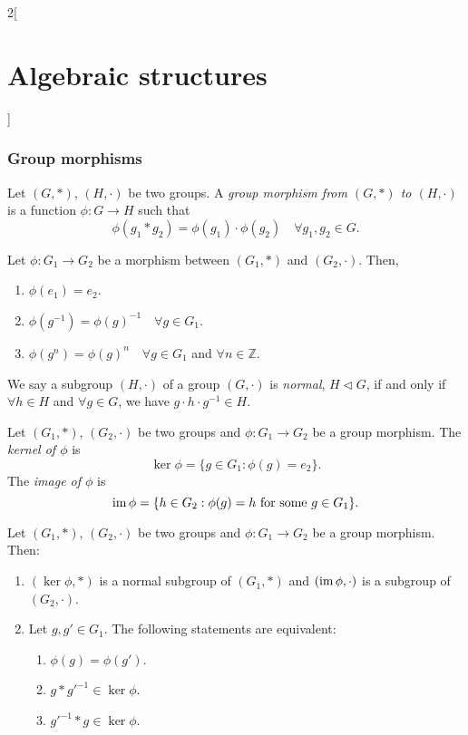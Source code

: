 \documentclass[class=article,10pt,crop=false]{standalone}
\begin{document}
\begin{multicols}{2}[\section{Algebraic structures}]
\subsubsection*{Group morphisms}
\begin{definition}
Let $(G,*)$, $(H,\cdot)$ be two groups. A \textit{group morphism from $(G,*)$ to $(H,\cdot)$} is a function $\phi:G\rightarrow H$ such that $$\phi(g_1*g_2)=\phi(g_1)\cdot\phi(g_2)\quad\forall g_1,g_2\in G.$$
\end{definition}
\begin{lemma}
Let $\phi:G_1\rightarrow G_2$ be a morphism between $(G_1,*)$ and $(G_2,\cdot)$. Then,
\begin{enumerate}
    \item $\phi(e_1)=e_2$.
    \item $\phi(g^{-1})=\phi(g)^{-1}\quad\forall g\in G_1$.
    \item $\phi(g^n)=\phi(g)^n\quad\forall g\in G_1$ and $\forall n\in\mathbb{Z}$.
\end{enumerate}
\end{lemma}
\begin{definition}
We say a subgroup $(H,\cdot)$ of a group $(G,\cdot)$ is \textit{normal}, $H\lhd G$, if and only if $\forall h\in H$ and $\forall g\in G$, we have $g\cdot h\cdot g^{-1}\in H$.
\end{definition}
\begin{definition}
Let $(G_1,*)$, $(G_2,\cdot)$ be two groups and $\phi:G_1\rightarrow G_2$ be a group morphism. The \textit{kernel of $\phi$} is $$\ker\phi=\{g\in G_1:\phi(g)=e_2\}.$$ The \textit{image of $\phi$} is $$\operatorname{im}\phi=\{h\in G_2:\phi(g)=h\text{ for some }g\in G_1\}.$$
\end{definition}
\begin{prop}
Let $(G_1,*)$, $(G_2,\cdot)$ be two groups and $\phi:G_1\rightarrow G_2$ be a group morphism. Then:
\begin{enumerate}
    \item $(\ker\phi,*)$ is a normal subgroup of $(G_1,*)$ and $(\operatorname{im}\phi,\cdot)$ is a subgroup of $(G_2,\cdot)$.
    \item Let $g,g'\in G_1$. The following statements are equivalent:
    \begin{enumerate}
        \item $\phi(g)=\phi(g')$.
        \item $g*g'^{-1}\in\ker\phi$.
        \item $g'^{-1}*g\in\ker\phi$.
    \end{enumerate}

\end{enumerate}
\end{prop}
\end{multicols}
\end{document}
